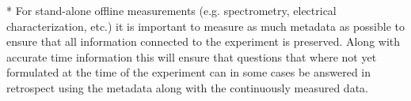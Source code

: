 * For stand-alone offline measurements (e.g. spectrometry, electrical
  characterization, etc.) it is important to measure as much metadata as
  possible to ensure that all information connected to the experiment is
  preserved. Along with accurate time information this will ensure that
  questions that where not yet formulated at the time of the experiment can in
  some cases be answered in retrospect using the metadata along with the
  continuously measured data.
  
